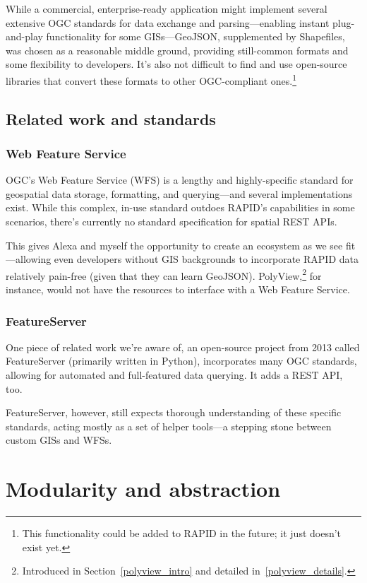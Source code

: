 While a commercial, enterprise-ready application might implement several extensive OGC standards for data exchange and parsing---enabling instant plug-and-play functionality for some GISs---GeoJSON, supplemented by Shapefiles, was chosen as a reasonable middle ground, providing still-common formats and some flexibility to developers. It's also not difficult to find and use open-source libraries that convert these formats to other OGC-compliant ones.\footnote{This functionality could be added to RAPID in the future; it just doesn't exist yet.}

\subsection{Related work and standards}
\subsubsection{Web Feature Service}
OGC's Web Feature Service (WFS) is a lengthy and highly-specific standard for geospatial data storage, formatting, and querying---and several implementations exist. While this complex, in-use standard outdoes RAPID's capabilities in some scenarios, there's currently no standard specification for spatial REST APIs.

This gives Alexa and myself the opportunity to create an ecosystem as we see fit---allowing even developers without GIS backgrounds to incorporate RAPID data relatively pain-free (given that they can learn GeoJSON). PolyView,\footnote{Introduced in Section~\ref{polyview_intro} and detailed in~\ref{polyview_details}.} for instance, would not have the resources to interface with a Web Feature Service.

\subsubsection{FeatureServer}

One piece of related work we're aware of, an open-source project from 2013 called FeatureServer (primarily written in Python), incorporates many OGC standards, allowing for automated and full-featured data querying. It adds a REST API, too.

FeatureServer, however, still expects thorough understanding of these specific standards, acting mostly as a set of helper tools---a stepping stone between custom GISs and WFSs.

\section{Modularity and abstraction}
